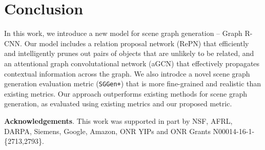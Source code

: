 \section{Conclusion}

In this work, we introduce a new model for scene graph generation -- Graph R-CNN. Our model includes a relation proposal network (RePN) that efficiently and intelligently prunes out pairs of objects that are unlikely to be related, and an attentional graph convolutational network (aGCN) that effectively propagates contextual information across the graph. We also introdce a novel scene graph generation evaluation metric (\texttt{SGGen+}) that is more fine-grained and realistic than existing metrics. Our approach outperforms existing methods for scene graph generation, as evaluated using existing metrics and our proposed metric.

\noindent\small{\textbf{Acknowledgements}.} This work was supported in part by NSF, AFRL, DARPA, Siemens, Google, Amazon, ONR YIPs and ONR Grants N00014-16-1-\{2713,2793\}.
